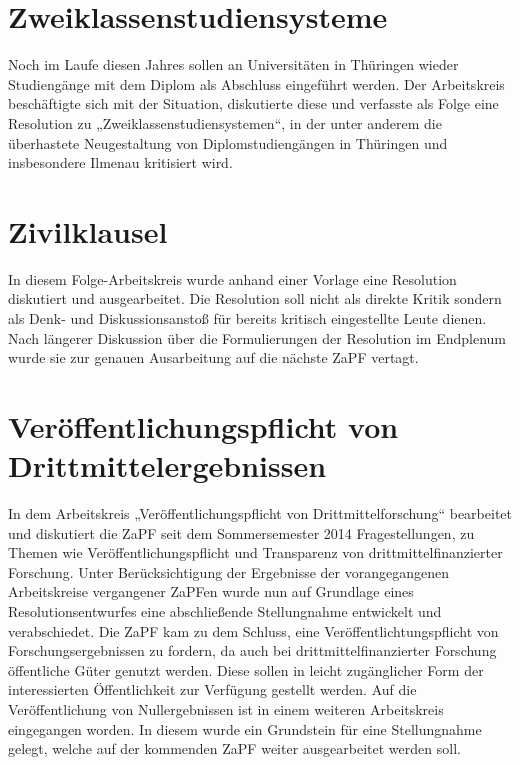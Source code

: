 \section*{Zweiklassenstudiensysteme}
Noch im Laufe diesen Jahres sollen an Universitäten in Thüringen wieder Studiengänge mit 
dem Diplom als Abschluss eingeführt werden. Der Arbeitskreis beschäftigte sich mit der Situation,
diskutierte diese und verfasste als Folge eine Resolution zu „Zweiklassenstudiensystemen“, 
in der unter anderem die überhastete Neugestaltung von Diplomstudiengängen in Thüringen und insbesondere Ilmenau kritisiert wird.

\section*{Zivilklausel}
In diesem Folge-Arbeitskreis wurde anhand einer Vorlage eine Resolution diskutiert und
ausgearbeitet. Die Resolution soll nicht als direkte Kritik sondern als Denk- und Diskussionsanstoß 
für bereits kritisch eingestellte Leute dienen. Nach längerer Diskussion über die Formulierungen der Resolution 
im Endplenum wurde sie zur genauen Ausarbeitung auf die nächste ZaPF vertagt.

\section*{Veröffentlichungspflicht von Drittmittelergebnissen}
In dem Arbeitskreis „Veröffentlichungspflicht von Drittmittelforschung“ bearbeitet 
und diskutiert die ZaPF seit dem Sommersemester 2014 Fragestellungen, zu Themen wie 
Veröffentlichungspflicht und Transparenz von drittmittelfinanzierter Forschung. 
Unter Berücksichtigung der Ergebnisse der vorangegangenen Arbeitskreise vergangener 
ZaPFen wurde nun auf Grundlage eines Resolutionsentwurfes eine abschließende Stellungnahme 
entwickelt und verabschiedet. %
Die ZaPF kam zu dem Schluss, eine Veröffentlichtungspflicht von Forschungsergebnissen zu fordern, 
da auch bei drittmittelfinanzierter Forschung öffentliche Güter genutzt werden. Diese sollen in leicht zugänglicher Form der interessierten Öffentlichkeit zur Verfügung gestellt werden. Auf die Veröffentlichung von Nullergebnissen ist in einem weiteren 
Arbeitskreis eingegangen worden. In diesem wurde ein Grundstein für eine Stellungnahme gelegt, 
welche auf der kommenden ZaPF weiter ausgearbeitet werden soll.



